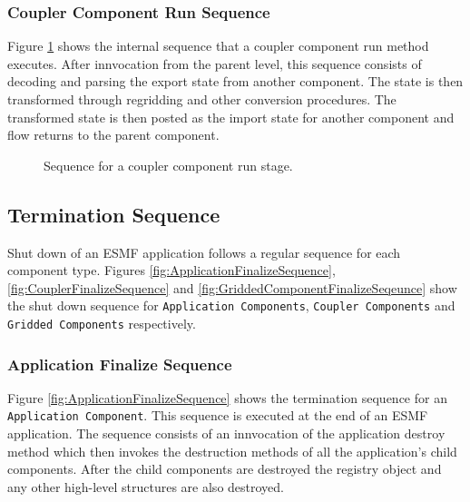 \subsubsection{Coupler Component Run Sequence}
Figure \ref{fig:CouplerComponentsRunSequence} shows the internal sequence
that a coupler component run method executes. After innvocation
from the parent level, this sequence consists
of decoding and parsing the export state from another component.
The state is then transformed through regridding and other conversion
procedures. The transformed state is then posted as the import state
for another component and flow returns to the parent component.
\begin{figure}
\caption[{Coupler Component Run Sequence}]{Sequence for a coupler component
run stage.\\}
\label{fig:CouplerComponentsRunSequence}
\end{figure}

\subsection{Termination Sequence}
Shut down of an ESMF application follows a regular sequence for each component
type. Figures 
\ref{fig:ApplicationFinalizeSequence}, 
\ref{fig:CouplerFinalizeSequence} and 
\ref{fig:GriddedComponentFinalizeSeqeunce} show the shut down sequence for 
{\tt Application Components}, {\tt Coupler Components} and {\tt Gridded Components} respectively.
\subsubsection{Application Finalize Sequence}

Figure \ref{fig:ApplicationFinalizeSequence} shows the termination sequence
for an {\tt Application Component}. This sequence is executed at
the end of an ESMF application. The sequence consists of an innvocation
of the application destroy method which then invokes the destruction methods 
of all the application's child components. After the child components are
destroyed the registry object and any other high-level structures are 
also destroyed.

